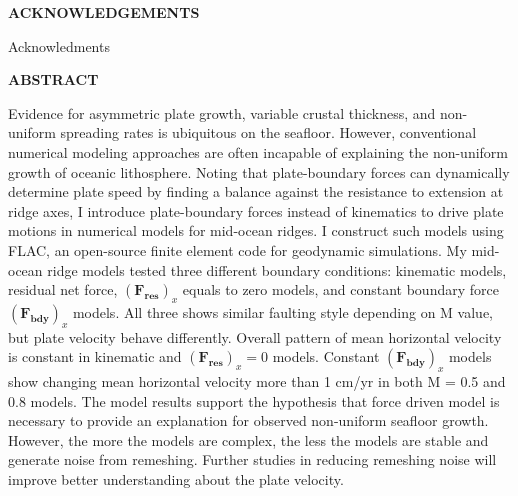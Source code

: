 \documentclass[letterpaper,12pt,notitle]{memphisthesis}                     %
\begin{document}



\doublespacing
{}

\setcounter{page}{2}

\begin{center}
	\textbf{ACKNOWLEDGEMENTS}
\end{center}
\vspace{-0.15in}

Acknowledments~

\newpage
\begin{center}
	\textbf{ABSTRACT}
\end{center}
\vspace{-0.15in}

\thispagestyle{plain}

Evidence for asymmetric plate growth, variable crustal thickness, and non-uniform spreading rates is ubiquitous on the seafloor. However, conventional numerical modeling approaches are often incapable of explaining the non-uniform growth of oceanic lithosphere. Noting that plate-boundary forces can dynamically determine plate speed by finding a balance against the resistance to extension at ridge axes, I introduce plate-boundary forces instead of kinematics to drive plate motions in numerical models for mid-ocean ridges. I construct such models using FLAC, an open-source finite element code for geodynamic simulations. My mid-ocean ridge models tested three different boundary conditions: kinematic models, residual net force, $(\boldsymbol{F_{res}})_x$ equals to zero models, and constant boundary force $(\boldsymbol{F_{bdy}})_x$ models. All three shows similar faulting style depending on M value, but plate velocity behave differently. Overall pattern of mean horizontal velocity is constant in kinematic and $(\boldsymbol{F_{res}})_x = 0$ models. Constant $(\boldsymbol{F_{bdy}})_x$ models show changing mean horizontal velocity more than 1 cm/yr in both M = 0.5 and 0.8 models. The model results support the hypothesis that force driven model is necessary to provide an explanation for observed non-uniform seafloor growth. However, the more the models are complex, the less the models are stable and generate noise from remeshing. Further studies in reducing remeshing noise will improve better understanding about the plate velocity.

\newpage

\begin{singlespace}
	\tableofcontents
\end{singlespace}
\end{document}
